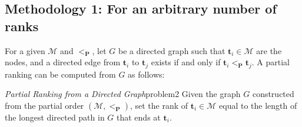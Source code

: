 \documentclass[acmsmall,screen, review]{acmart}
\begin{document}
%
%



\subsection{Methodology 1: For an arbitrary number of ranks}
\label{sec3:m2}

For a given $\mathcal{M}$ and $<_{\mathbf{P}}$, let $G$ be a directed graph such that $\mathbf{t}_i \in \mathcal{M}$ are the nodes, and a directed edge from $\mathbf{t}_i$ to $\mathbf{t}_j$ exists if and only if $\mathbf{t}_i <_{\mathbf{P}} \mathbf{t}_j$. A partial ranking can be computed from $G$ as follows:

\begin{mytheo}{\textit{Partial Ranking from a Directed Graph}}{problem2}
	Given the graph $G$ constructed from the partial order $(\mathcal{M}, <_{\mathbf{P}})$, set the rank of $\mathbf{t}_i \in \mathcal{M}$ equal to the length of the longest directed path in $G$ that ends at $\mathbf{t}_i$.
\end{mytheo}
\end{document}
